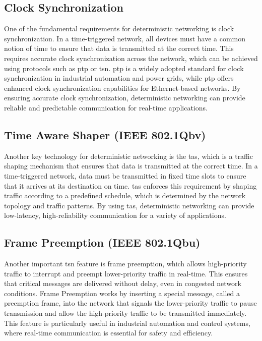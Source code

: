 \documentclass[runningheads]{llncs}
\begin{document}
\subsection*{Clock Synchronization}
One of the fundamental requirements for deterministic networking is clock synchronization. In a time-triggered network, all devices must have a common notion of time to ensure that data is transmitted at the correct time. This requires accurate clock synchronization across the network, which can be achieved using protocols such as \gls{ptp} or \gls{tsn}. \gls{ptp} is a widely adopted standard for clock synchronization in industrial automation and power grids, while \gls{ptp} offers enhanced clock synchronization capabilities for Ethernet-based networks. By ensuring accurate clock synchronization, deterministic networking can provide reliable and predictable communication for real-time applications.

\subsection*{Time Aware Shaper (IEEE 802.1Qbv)}
Another key technology for deterministic networking is the \gls{tas}, which is a traffic shaping mechanism that ensures that data is transmitted at the correct time. In a time-triggered network, data must be transmitted in fixed time slots to ensure that it arrives at its destination on time. \gls{tas} enforces this requirement by shaping traffic according to a predefined schedule, which is determined by the network topology and traffic patterns. By using \gls{tas}, deterministic networking can provide low-latency, high-reliability communication for a variety of applications.

\subsection*{Frame Preemption (IEEE 802.1Qbu)}
Another important \gls{tsn} feature is frame preemption, which allows high-priority traffic to interrupt and preempt lower-priority traffic in real-time. This ensures that critical messages are delivered without delay, even in congested network conditions. Frame Preemption works by inserting a special message, called a preemption frame, into the network that signals the lower-priority traffic to pause transmission and allow the high-priority traffic to be transmitted immediately. This feature is particularly useful in industrial automation and control systems, where real-time communication is essential for safety and efficiency.
\end{document}
